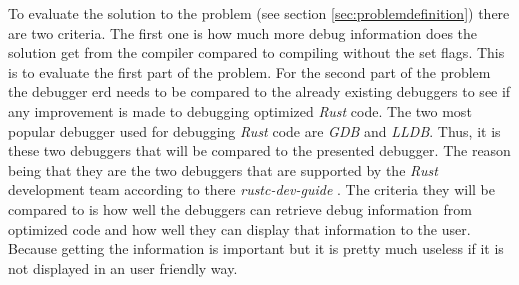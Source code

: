 

To evaluate the solution to the problem (see section \ref{sec:problemdefinition}) there are two criteria.
The first one is how much more debug information does the solution get from the compiler compared to compiling without the set flags.
This is to evaluate the first part of the problem.
For the second part of the problem the debugger \gls{erd} needs to be compared to the already existing debuggers to see if any improvement is made to debugging optimized \emph{Rust} code.
The two most popular debugger used for debugging \emph{Rust} code are \emph{GDB} and \emph{LLDB}.
Thus, it is these two debuggers that will be compared to the presented debugger.
The reason being that they are the two debuggers that are supported by the \emph{Rust} development team according to there \emph{rustc-dev-guide} \cite{rust-dev-guide}.
The criteria they will be compared to is how well the debuggers can retrieve debug information from optimized code and how well they can display that information to the user.
Because getting the information is important but it is pretty much useless if it is not displayed in an user friendly way.


